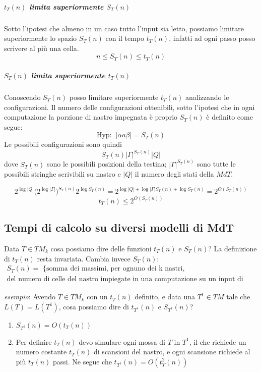 \subparagraph{$t_{T}(n)$ limita superiormente $S_{T}(n)$}

Sotto l'ipotesi che almeno in un caso tutto l'input sia letto, possiamo limitare superiormente lo spazio $S_{T}(n)$ con il tempo $t_{T}(n)$, infatti ad ogni passo posso scrivere al più una cella.
\[
	n \leq S_{T}(n) \leq t_{T}(n)
\]

\subparagraph{$S_{T}(n)$ limita superiormente $t_{T}(n)$} 

Conoscendo $S_{T}(n)$ posso limitare superiormente $t_{T}(n)$ analizzando le configurazioni. Il numero delle configurazioni ottenibili, sotto l'ipotesi che in ogni computazione la porzione di nastro impegnata è proprio $S_{T}(n)$ è definito come segue:
\[
	\text{Hyp: } \ |\alpha a \beta | = S_{T}(n)
\]
Le possibili configurazioni sono quindi
\[
	S_{T}(n)  | \Gamma |^{S_{T}(n)}  |Q|
\]
dove $S_{T}(n)$ sono le possibili posizioni della testina; $| \Gamma |^{S_{T}(n)}$ sono tutte le possibili stringhe scrivibili su nastro e $|Q|$ il numero degli stati della $MdT$.

\[
	2^{\log|Q|} \big( 2^{\log|\Gamma|} \big)^{S_{T}(n)} 2^{\log S_{T}(n)} = 2^{\log|Q| + \log|\Gamma|S_{T}(n) + \log S_{T}(n) } = 2^{O(S_{T}(n))}
\]
\[
	t_{T}(n) \leq 2^{O(S_{T}(n))}
\]

\subsection{Tempi di calcolo su diversi modelli di MdT}

Data $T \in  TM_{k}$ cosa possiamo dire delle funzioni $t_{T}(n)$ e $S_{T}(n)$?
La definizione di $t_{T}(n)$ resta invariata. Cambia invece $S_{T}(n)$:
\begin{gather*}
S_{T}(n) = \text{ \{somma dei massimi, per ognuno dei k nastri,} \\ \text{del numero di celle del nastro impiegate in una computazione su un input di lunghezza n\} }
\end{gather*}

\begin{description}
\item \textit{esempio}:
Avendo $T \in  TM_{k}$ con un $t_{T}(n)$ definito, e data una $T^{1} \in  TM$ tale che $L(T) = L(T^{1})$, cosa possiamo dire di $t_{T^{1}}(n)$ e $S_{T^{1}}(n)$?

\begin{enumerate}
\item $S_{T^{1}}(n) = O(t_{T}(n))$
\item Per definire $t_{T}(n)$ devo simulare ogni mossa di $T$ in $T^{1}$, il che richiede un numero costante $t_{T}(n)$ di scansioni del nastro, e ogni scansione richiede al più $t_{T}(n)$ passi. Ne segue che $t_{T^{1}}(n) = O(t_{T}^{2}(n))$
\end{enumerate}

\end{description}

